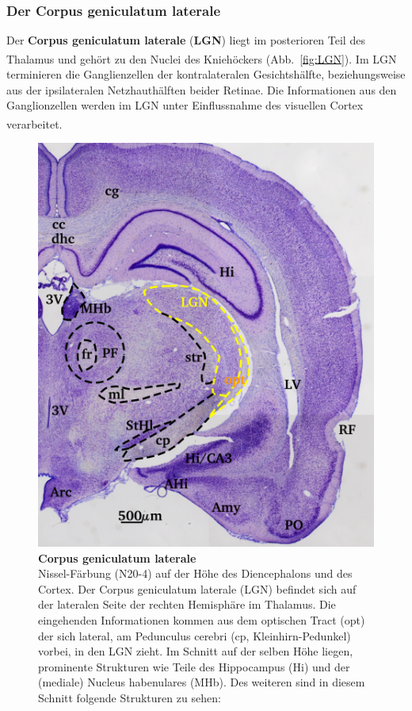 \documentclass[12pt,a4paper,pdftex]{article}
\begin{document}
\newpage
\subsubsection*{Der Corpus geniculatum laterale}

Der \textbf{Corpus geniculatum laterale} (\textbf{LGN})  liegt im posterioren Teil des Thalamus und gehört zu den Nuclei des Kniehöckers (Abb.~\ref{fig:LGN}). \textsuperscript{\cite[12]{crossman2014neuroanatomy}} Im LGN terminieren die Ganglienzellen der kontralateralen Gesichtshälfte, beziehungsweise aus der ipsilateralen Netzhauthälften beider Retinae. Die Informationen aus den Ganglionzellen werden im LGN unter Einflussnahme des visuellen Cortex verarbeitet.
\textsuperscript{\cite[8.1]{trepel2011neuroanatomie}}

\begin{figure}[H]
    \centering
    \includegraphics{pictures/visual/LGN.png}
    \caption[Corpus geniculatum laterale]{\textbf{Corpus geniculatum laterale}\\
    Nissel-Färbung (N20-4) auf der Höhe des Diencephalons und des Cortex. Der Corpus geniculatum laterale (LGN) befindet sich auf der lateralen Seite der rechten Hemisphäre im Thalamus. Die eingehenden Informationen kommen aus dem optischen Tract (opt) der sich lateral, am Pedunculus cerebri (cp, Kleinhirn-Pedunkel) vorbei, in den LGN zieht. Im Schnitt auf der selben Höhe liegen, prominente Strukturen wie Teile des Hippocampus (Hi) und der (mediale) Nucleus habenulares (MHb). Des weiteren sind in diesem Schnitt folgende Strukturen zu sehen: 
}
\end{figure}
\end{document}
